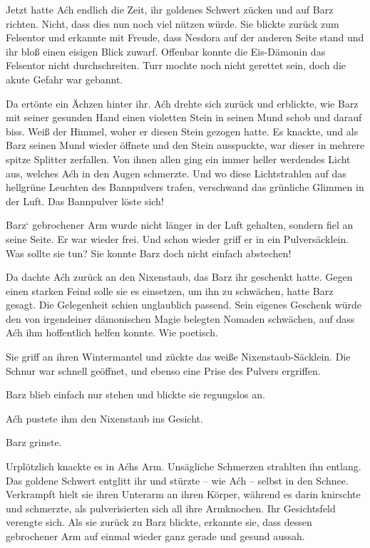 Jetzt hatte Aćh endlich die Zeit, ihr goldenes Schwert zücken und auf Barz richten. Nicht, dass dies nun noch viel nützen würde. Sie blickte zurück zum Felsentor und erkannte mit Freude, dass Nesdora auf der anderen Seite stand und ihr bloß einen eisigen Blick zuwarf. Offenbar konnte die Eis-Dämonin das Felsentor nicht durchschreiten. Turr mochte noch nicht gerettet sein, doch die akute Gefahr war gebannt.

Da ertönte ein Ächzen hinter ihr. Aćh drehte sich zurück und erblickte, wie Barz mit seiner gesunden Hand einen violetten Stein in seinen Mund schob und darauf biss. Weiß der Himmel, woher er diesen Stein gezogen hatte. Es knackte, und als Barz seinen Mund wieder öffnete und den Stein ausspuckte, war dieser in mehrere spitze Splitter zerfallen. Von ihnen allen ging ein immer heller werdendes Licht aus, welches Aćh in den Augen schmerzte. Und wo diese Lichtstrahlen auf das hellgrüne Leuchten des Bannpulvers trafen, verschwand das grünliche Glimmen in der Luft. Das Bannpulver löste sich!

Barz‘ gebrochener Arm wurde nicht länger in der Luft gehalten, sondern fiel an seine Seite. Er war wieder frei. Und schon wieder griff er in ein Pulversäcklein. Was sollte sie tun? Sie konnte Barz doch nicht einfach abstechen!

Da dachte Aćh zurück an den Nixenstaub, das Barz ihr geschenkt hatte. Gegen einen starken Feind solle sie es einsetzen, um ihn zu schwächen, hatte Barz gesagt. Die Gelegenheit schien unglaublich passend. Sein eigenes Geschenk würde den von irgendeiner dämonischen Magie belegten Nomaden schwächen, auf dass Aćh ihm hoffentlich helfen konnte. Wie poetisch.

Sie griff an ihren Wintermantel und zückte das weiße Nixenstaub-Säcklein. Die Schnur war schnell geöffnet, und ebenso eine Prise des Pulvers ergriffen.

Barz blieb einfach nur stehen und blickte sie regungslos an.

Aćh pustete ihm den Nixenstaub ins Gesicht.

Barz grinste.

Urplötzlich knackte es in Aćhs Arm. Unsägliche Schmerzen strahlten ihn entlang. Das goldene Schwert entglitt ihr und stürzte – wie Aćh – selbst in den Schnee. Verkrampft hielt sie ihren Unterarm an ihren Körper, während es darin knirschte und schmerzte, als pulverisierten sich all ihre Armknochen. Ihr Gesichtsfeld verengte sich. Als sie zurück zu Barz blickte, erkannte sie, dass dessen gebrochener Arm auf einmal wieder ganz gerade und gesund aussah.

